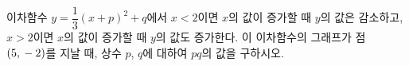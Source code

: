 \hspace*{2mm}\begin{minipage}[t]{\dimexpr\linewidth-2mm\relax}\vspace{0pt}
이차함수 $y=\dfrac{1}{3}(x+p)^2+q$에서 $x<2$이면 $x$의 값이 증가할 때 $y$의 값은 감소하고, $x>2$이면 $x$의 값이 증가할 때 $y$의 값도 증가한다. 이 이차함수의 그래프가 점 $(5{,}\mkern3mu -2)$를 지날 때, 상수 $p$, $q$에 대하여 $pq$의 값을 구하시오.\end{minipage}
